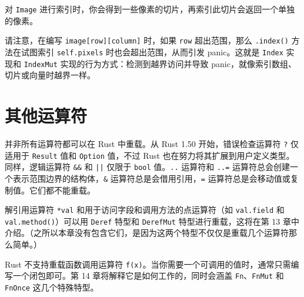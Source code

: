 对 \texttt{Image} 进行索引时，你会得到一些像素的切片，再索引此切片会返回一个单独的像素。

请注意，在编写 \texttt{image[row][column]} 时，如果 \texttt{row} 超出范围，那么 \texttt{.index()} 方法在试图索引 \texttt{self.pixels} 时也会超出范围，从而引发 panic。这就是 \texttt{Index} 实现和 \texttt{IndexMut} 实现的行为方式：检测到越界访问并导致 panic，就像索引数组、切片或向量时越界一样。

\section{其他运算符}

并非所有运算符都可以在 Rust 中重载。从 Rust 1.50 开始，错误检查运算符 \texttt{?} 仅适用于 \texttt{Result} 值和 \texttt{Option} 值，不过 Rust 也在努力将其扩展到用户定义类型。同样，逻辑运算符 \texttt{\&\&} 和 \texttt{||} 仅限于 \texttt{bool} 值。\texttt{..} 运算符和 \texttt{..=} 运算符总会创建一个表示范围边界的结构体，\texttt{\&} 运算符总是会借用引用，\texttt{=} 运算符总是会移动值或复制值。它们都不能重载。

解引用运算符 \texttt{*val} 和用于访问字段和调用方法的点运算符（如 \texttt{val.field} 和 \texttt{val.method()}）可以用 \texttt{Deref} 特型和 \texttt{DerefMut} 特型进行重载，这将在第 13 章中介绍。（之所以本章没有包含它们，是因为这两个特型不仅仅是重载几个运算符那么简单。）

Rust 不支持重载函数调用运算符 \texttt{f(x)}。当你需要一个可调用的值时，通常只需编写一个闭包即可。第 14 章将解释它是如何工作的，同时会涵盖 \texttt{Fn}、\texttt{FnMut} 和 \texttt{FnOnce} 这几个特殊特型。

